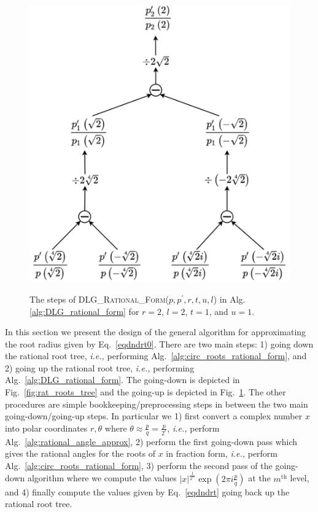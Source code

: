 \documentclass[runningheads]{llncs}
\begin{document}
\begin{figure}[h]
  \centering
  \includegraphics[width=0.8\linewidth]{p_prime.png}
  \caption{The steps of \textsc{DLG\_Rational\_Form}($p,p^\prime,r,t,u,l$) in Alg.\ref{alg:DLG_rational_form} for $r=2$, $l=2$, $t=1$, and $u=1$.}\label{fig:DLG}
  \caption{}
\end{figure}

In this section we present the design of the general algorithm for approximating the root radius given by Eq.~\ref{eqdndrt0}.
There are two main steps: 1) going down the rational root tree, \emph{i.e.,} performing Alg.~\ref{alg:circ_roots_rational_form}, and 2) going up the rational root tree, \emph{i.e.,} performing Alg.~\ref{alg:DLG_rational_form}.
The going-down is depicted in Fig.~\ref{fig:rat_roots_tree} and the going-up is depicted in Fig.~\ref{fig:DLG}.
The other procedures are simple bookkeeping/preprocessing steps in between the two main going-down/going-up steps.
In particular we
1) first convert a complex number $x$ into polar coordinates $r,\theta$ where $\theta \approx \frac{p}{q} = \frac{p}{2^\epsilon}$, \emph{i.e.,} perform Alg.~\ref{alg:rational_angle_approx},
2) perform the first going-down pass which gives the rational angles for the roots of $x$ in fraction form, \emph{i.e.,} perform Alg.~\ref{alg:circ_roots_rational_form},
3) perform the second pass of the going-down algorithm where we compute the values $|x|^{\frac{1}{2^m}} \exp(2 \pi i \frac{p}{q})$ at the $m^\mathrm{th}$ level, and
4) finally compute the values given by Eq.~\ref{eqdndrt} going back up the rational root tree.
\end{document}
